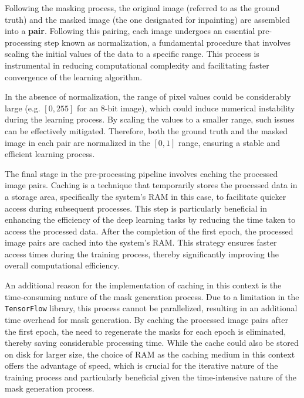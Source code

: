 
Following the masking process, the original image (referred to as the ground truth) and the masked image (the one designated for inpainting) are assembled into a \textbf{pair}. Following this pairing, each image undergoes an essential pre-processing step known as normalization, a fundamental procedure that involves scaling the initial values of the data to a specific range. This process is instrumental in reducing computational complexity and facilitating faster convergence of the learning algorithm.

In the absence of normalization, the range of pixel values could be considerably large (e.g. $[0, 255]$ for an 8-bit image), which could induce numerical instability during the learning process. By scaling the values to a smaller range, such issues can be effectively mitigated. Therefore, both the ground truth and the masked image in each pair are normalized in the $[0, 1]$ range, ensuring a stable and efficient learning process.



The final stage in the pre-processing pipeline involves caching the processed image pairs. Caching is a technique that temporarily stores the processed data in a storage area, specifically the system's RAM in this case, to facilitate quicker access during subsequent processes. This step is particularly beneficial in enhancing the efficiency of the deep learning tasks by reducing the time taken to access the processed data. After the completion of the first epoch, the processed image pairs are cached into the system's RAM. This strategy ensures faster access times during the training process, thereby significantly improving the overall computational efficiency.

An additional reason for the implementation of caching in this context is the time-consuming nature of the mask generation process. Due to a limitation in the \texttt{TensorFlow} library, this process cannot be parallelized, resulting in an additional time overhead for mask generation. By caching the processed image pairs after the first epoch, the need to regenerate the masks for each epoch is eliminated, thereby saving considerable processing time. While the cache could also be stored on disk for larger size, the choice of RAM as the caching medium in this context offers the advantage of speed, which is crucial for the iterative nature of the training process and particularly beneficial given the time-intensive nature of the mask generation process.
